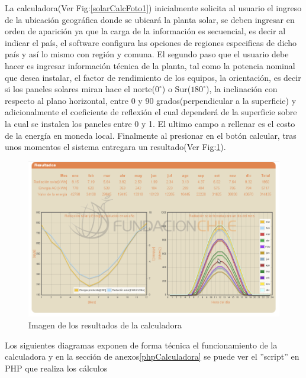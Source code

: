 La calculadora(Ver Fig:\ref{solarCalcFoto1}) inicialmente solicita al usuario el ingreso de la ubicación geográfica donde se ubicará la planta solar, se deben ingresar en orden de aparición ya que la carga de la información es secuencial, es decir al indicar el país, el software configura las opciones de regiones especificas de dicho país y así lo mismo con región y comuna. El segundo paso que el usuario debe hacer es ingresar información técnica de la planta, tal como la potencia nominal que desea instalar, el factor de rendimiento de los equipos, la orientación, es decir si los paneles solares miran hace el norte($0^{\circ}$) o Sur($180^{\circ}$), la inclinación con respecto al plano horizontal, entre 0 y 90 grados(perpendicular a la superficie) y adicionalmente el coeficiente de reflexión el cual dependerá de la superficie sobre la cual se instalen los paneles entre 0 y 1. El ultimo campo a rellenar es el costo de la energía en moneda local. Finalmente al presionar en el botón calcular, tras unos momentos el sistema entregara un resultado(Ver Fig:\ref{solarCalcFoto2}).\\

\begin{figure}[h!]
        \centering
        \includegraphics[scale=0.4]{images/calculadoraFoto2}
        \caption{Imagen de los resultados de la calculadora}
        \label{solarCalcFoto2}
\end{figure}

Los siguientes diagramas exponen de forma técnica el funcionamiento de la calculadora y en la sección de anexos\ref{phpCalculadora} se puede ver el ''script'' en PHP que realiza los cálculos\\

